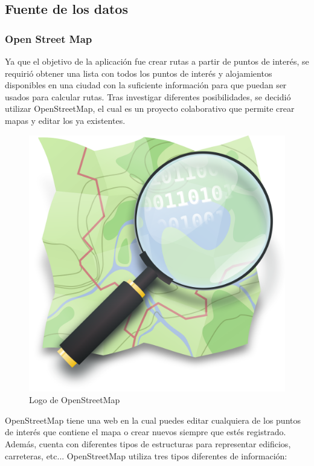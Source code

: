 \subsection[Fuente de los datos]{Fuente de los datos}
\subsubsection[OSM]{Open Street Map}
Ya que el objetivo de la aplicación fue crear rutas a partir de puntos de interés, se requirió obtener una lista con todos los puntos de interés y alojamientos disponibles en una ciudad con la suficiente información para que puedan ser usados para calcular rutas.\newline
Tras investigar diferentes posibilidades, se decidió utilizar OpenStreetMap, el cual es un proyecto colaborativo que permite crear mapas y editar los ya existentes.\newline
\begin{figure}[H]
	\centering
	\includegraphics[scale=0.05]{imagenes/Openstreetmap_logo}
	\caption{Logo de OpenStreetMap}
	\label{fig:openstreetmap}
\end{figure}
OpenStreetMap tiene una web \cite{openstreetmap} en la cual puedes editar cualquiera de los puntos de interés que contiene el mapa o crear nuevos siempre que estés registrado. Además, cuenta con diferentes tipos de estructuras para representar edificios, carreteras, etc... OpenStreetMap utiliza tres tipos diferentes de información:\newline
